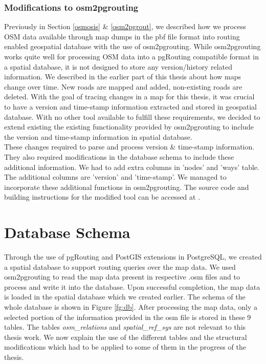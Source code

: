 \subsubsection{Modifications to osm2pgrouting} \label{modifications}
Previously in Section \ref{osmosis} \& \ref{osm2pgrout}, we described how we process OSM data available through map dumps in the pbf file format into routing enabled geospatial database with the use of osm2pgrouting. While osm2pgrouting works quite well for processing OSM data into a pgRouting compatible format in a spatial database, it is not designed to store any version/history related information. We described in the earlier part of this thesis about how maps change over time. New roads are mapped and added, non-existing roads are deleted. With the goal of tracing changes in a map for this thesis, it was crucial to have a version and time-stamp information extracted and stored in geospatial database. With no other tool available to fulfill these requirements, we decided to extend existing the existing functionality provided by osm2pgrouting to include the version and time-stamp information in spatial database. \\

These changes required to parse and process version \& time-stamp information. They also required modifications in the database schema to include these additional information. We had to add extra columns in 'nodes' and 'ways' table. The additional columns are 'version' and 'time-stamp'. We managed to incorporate these additional functions in osm2pgrouting. The source code and building instructions for the modified tool can be accessed at \cite{sharma2016}. 
\section{Database Schema}\label{dbschema}
Through the use of pgRouting and PostGIS extensions in PostgreSQL, we created a spatial database to support routing queries over the map data. We used osm2pgrouting to read the map data present in respective .osm files and to process and write it into the database. Upon successful completion, the map data is loaded in the spatial database which we created earlier. The schema of the whole database is shown in Figure \ref{fg:db}. After processing the map data, only a selected portion of the information provided in the osm file is stored in these 9 tables. The tables \textit{osm{\_}relations} and \textit{spatial{\_}ref{\_}sys} are not relevant to this thesis work. We now explain the use of the different tables and the structural modifications which had to be applied to some of them in the progress of the thesis.


